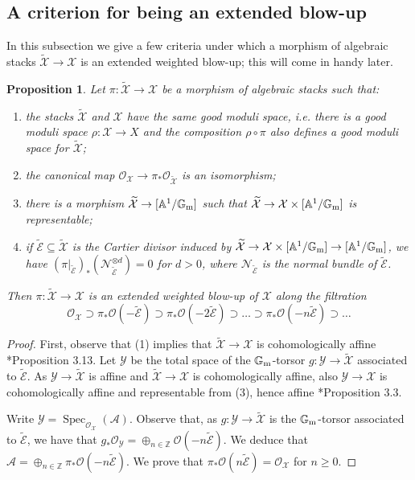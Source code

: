 \documentclass{amsart}
\newcommand{\bA}{\mathbb{A}}
\newcommand{\bG}{\mathbb{G}}
\newcommand{\bZ}{\mathbb{Z}}
\newcommand{\cA}{\mathcal{A}}
\newcommand{\cE}{\mathcal{E}}
\newcommand{\cN}{\mathcal{N}}
\newcommand{\cO}{\mathcal{O}}
\newcommand{\cX}{\mathcal{X}}
\newcommand{\cY}{\mathcal{Y}}
\newcommand{\spec}{\operatorname{Spec}}
\newcommand{\Gm}{\bG_{{\rm m}}}
\newtheorem{Prop}[theorem]{Proposition}
\theoremstyle{definition}
\theoremstyle{definition}
\begin{document}
{\subsection{A criterion for being an extended blow-up}\label{subsection_criterion_for_ext_wblowups}
In this subsection we give a few criteria under which a morphism of algebraic stacks $\widetilde{\cX}\to \cX$ is an extended weighted blow-up; this will come in handy later.
\begin{Prop}\label{prop:criterion}
    Let $\pi\colon\widetilde{\cX}\to\cX$ be a morphism of algebraic stacks such that:
    \begin{enumerate}
        \item the stacks $\widetilde{\cX}$ and $\cX$ have the same good moduli space, i.e. there is a good moduli space $\rho:\cX\to X$ and the composition $\rho\circ\pi$ also defines a good moduli space for $\widetilde{\cX}$;
        \item the canonical map $\cO_\cX\to \pi_*\cO_{\widetilde{\cX}}$ is an isomorphism;
        \item there is a morphism $\widetilde{\cX}\to [\bA^1/\Gm]$ such that $\widetilde{\cX}\to \cX\times[\bA^1/\Gm]$ is representable;
        \item if $\widetilde{\cE}\subseteq\widetilde{\cX}$ is the Cartier divisor induced by $\widetilde{\cX}\to\cX\times [\bA^1/\Gm]\to [\bA^1/\Gm]$, we have $(\pi|_{\widetilde{\cE}})_*(\cN_{\widetilde{\cE}}^{\otimes d})=0$ for $d>0$, where $\cN_{\widetilde{\cE}}$ is the normal bundle of $\widetilde{\cE}$.
    \end{enumerate}
    Then $\pi\colon\widetilde{\cX}\to \cX$ is an extended weighted blow-up of $\cX$ along the filtration
    \[ \cO_\cX\supset\pi_*\cO(-\widetilde{\cE}) \supset \pi_*\cO(-2\widetilde{\cE}) \supset \ldots \supset \pi_*\cO(-n\widetilde{\cE}) \supset \ldots\]
\end{Prop}
\begin{proof}
    First, observe that (1) implies that $\widetilde{\cX}\to \cX$ is cohomologically affine \cite{Alp}*{Proposition 3.13}. 
    Let $\cY$ be the total space of the $\Gm$-torsor $g\colon\cY\to\widetilde{\cX}$ associated to $\widetilde{\cE}$. As $\cY\to\widetilde{\cX}$ is affine and $\widetilde{\cX}\to\cX$ is cohomologically affine, also $\cY\to\cX$ is cohomologically affine and representable from (3), hence affine \cite{Alp}*{Proposition 3.3}.

    Write $\cY=\spec_{\cO_\cX}(\cA)$. Observe that, as $g\colon\cY\to\widetilde{\cX}$ is the $\Gm$-torsor associated to $\widetilde{\cE}$, we have that $g_*\cO_{\cY}=\oplus_{n\in\bZ} \cO(-n\widetilde{\cE})$. We deduce that $\cA=\oplus_{n\in\bZ} \pi_*\cO(-n\widetilde{\cE})$.    We prove that $\pi_*\cO(n\widetilde{\cE})=\cO_{\cX}$ for $n\geq 0$.
    

\end{proof}}
\end{document}
